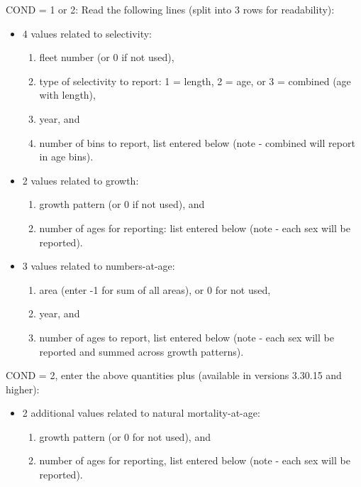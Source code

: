 COND = 1 or 2: Read the following lines (split into 3 rows for readability):
\begin{itemize}
	\item 4 values related to selectivity:
	\begin{enumerate}
		\item fleet number (or 0 if not used),
		\item type of selectivity to report: 1 = length, 2 = age, or 3 = combined (age with length),
		\item year, and
		\item number of bins to report, list entered below (note - combined will report in age bins).
	\end{enumerate}	
	\item 2 values related to growth:
	\begin{enumerate}
		\item growth pattern (or 0 if not used), and
		\item number of ages for reporting: list entered below (note - each sex will be reported).
	\end{enumerate}	
	\item 3 values related to numbers-at-age:
	\begin{enumerate}
		\item area (enter -1 for sum of all areas), or 0 for not used,
		\item year, and
		\item number of ages to report, list entered below (note - each sex will be reported and summed across growth patterns).
	\end{enumerate}
\end{itemize}

COND = 2, enter the above quantities plus (available in versions 3.30.15 and higher):  
\begin{itemize}
	\item 2 additional values related to natural mortality-at-age:
	\begin{enumerate}
		\item growth pattern (or 0 for not used), and
		\item number of ages for reporting, list entered below (note - each sex will be reported).
	\end{enumerate}
\end{itemize}

